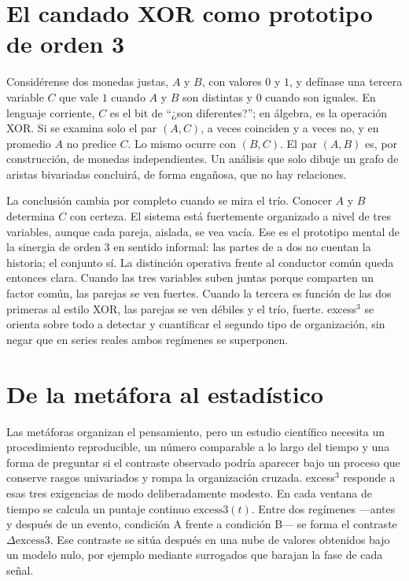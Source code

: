 \documentclass[11pt,a4paper]{article}
\begin{document}
\section{El candado XOR como prototipo de orden 3}
\label{sec:xor_idea}

Consid\'erense dos monedas justas, $A$ y $B$, con valores $0$ y $1$, y
def\'inase una tercera variable $C$ que vale $1$ cuando $A$ y $B$ son
distintas y $0$ cuando son iguales. En lenguaje corriente, $C$ es el bit de
``¿son diferentes?''; en \'algebra, es la operaci\'on XOR. Si se examina solo
el par $(A,C)$, a veces coinciden y a veces no, y en promedio $A$ no predice
$C$. Lo mismo ocurre con $(B,C)$. El par $(A,B)$ es, por construcci\'on, de
monedas independientes. Un an\'alisis que solo dibuje un grafo de aristas
bivariadas concluir\'a, de forma enga\~nosa, que no hay relaciones.

La conclusi\'on cambia por completo cuando se mira el tr\'io. Conocer $A$ y
$B$ determina $C$ con certeza. El sistema est\'a fuertemente organizado a
nivel de tres variables, aunque cada pareja, aislada, se vea vac\'ia. Ese es
el prototipo mental de la sinergia de orden 3 en sentido informal: las
partes de a dos no cuentan la historia; el conjunto s\'i. La distinci\'on
operativa frente al conductor com\'un queda entonces clara. Cuando las tres
variables suben juntas porque comparten un factor com\'un, las parejas se
ven fuertes. Cuando la tercera es funci\'on de las dos primeras al estilo
XOR, las parejas se ven d\'ebiles y el tr\'io, fuerte. excess$^3$ se orienta
sobre todo a detectar y cuantificar el segundo tipo de organizaci\'on, sin
negar que en series reales ambos reg\'imenes se superponen.

\section{De la met\'afora al estad\'istico}
\label{sec:numero}

Las met\'aforas organizan el pensamiento, pero un estudio cient\'ifico
necesita un procedimiento reproducible, un n\'umero comparable a lo largo
del tiempo y una forma de preguntar si el contraste observado podr\'ia
aparecer bajo un proceso que conserve rasgos univariados y rompa la
organizaci\'on cruzada. excess$^3$ responde a esas tres exigencias de modo
deliberadamente modesto. En cada ventana de tiempo se calcula un puntaje
continuo $\mathrm{excess3}(t)$. Entre dos reg\'imenes ---antes y despu\'es de
un evento, condici\'on A frente a condici\'on B--- se forma el contraste
$\Delta\mathrm{excess3}$. Ese contraste se sit\'ua despu\'es en una nube de
valores obtenidos bajo un modelo nulo, por ejemplo mediante surrogados que
barajan la fase de cada se\~nal.
\end{document}
